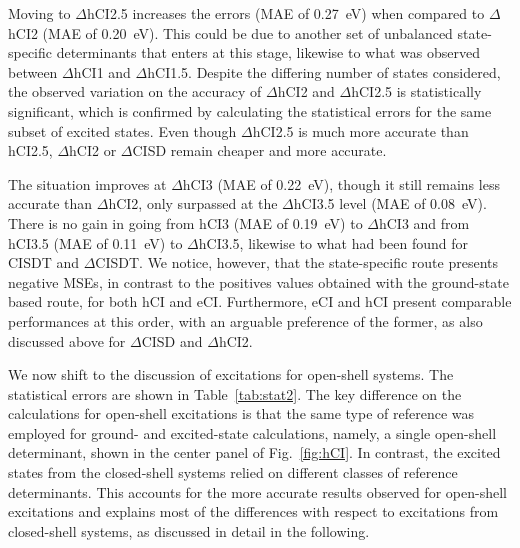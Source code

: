 \documentclass[aip,jcp,reprint,noshowkeys,superscriptaddress]{revtex4-1}
\begin{document}
Moving to $\Delta$hCI2.5 increases the errors (MAE of \SI{0.27}{\eV}) when compared to $\Delta$hCI2 (MAE of \SI{0.20}{\eV}).
This could be due to another set of unbalanced state-specific determinants that enters at this stage, likewise to what was observed between $\Delta$hCI1 and $\Delta$hCI1.5.
Despite the differing number of states considered, the observed variation on the accuracy of $\Delta$hCI2 and $\Delta$hCI2.5 is statistically significant,
which is confirmed by calculating the statistical errors for the same subset of excited states.
Even though $\Delta$hCI2.5 is much more accurate than hCI2.5, $\Delta$hCI2 or $\Delta$CISD remain cheaper and more accurate.

The situation improves at $\Delta$hCI3 (MAE of \SI{0.22}{\eV}), though it still remains less accurate than $\Delta$hCI2,
only surpassed at the $\Delta$hCI3.5 level (MAE of \SI{0.08}{\eV}).
There is no gain in going from hCI3 (MAE of \SI{0.19}{\eV}) to $\Delta$hCI3 and from hCI3.5 (MAE of \SI{0.11}{\eV}) to $\Delta$hCI3.5,
likewise to what had been found for CISDT and $\Delta$CISDT. \cite{Kossoski_2023}
We notice, however, that the state-specific route presents negative MSEs, in contrast to the positives values obtained with the ground-state based route, for both hCI and eCI.
Furthermore, eCI and hCI present comparable performances at this order, with an arguable preference of the former,
as also discussed above for $\Delta$CISD and $\Delta$hCI2.

We now shift to the discussion of excitations for open-shell systems.
The statistical errors are shown in Table~\ref{tab:stat2}.
The key difference on the calculations for open-shell excitations is that the same type of reference was employed for ground- and excited-state calculations, namely,
a single open-shell determinant, shown in the center panel of Fig.~\ref{fig:hCI}.
In contrast, the excited states from the closed-shell systems relied on different classes of reference determinants.
This accounts for the more accurate results observed for open-shell excitations and explains most of the differences with respect to excitations from closed-shell systems, as discussed in detail in the following.
\end{document}

